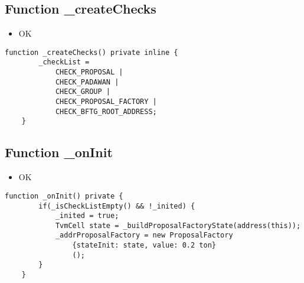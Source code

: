 \subsection{Function \_{}createChecks}

\begin{itemize}
\item OK
\end{itemize}

\begin{lstlisting}[firstnumber=42]
    function _createChecks() private inline {
        _checkList =
            CHECK_PROPOSAL |
            CHECK_PADAWAN |
            CHECK_GROUP |
            CHECK_PROPOSAL_FACTORY |
            CHECK_BFTG_ROOT_ADDRESS;
    }
\end{lstlisting}

\subsection{Function \_{}onInit}

\begin{itemize}
\item OK
\end{itemize}

\begin{lstlisting}[firstnumber=93]
    function _onInit() private {
        if(_isCheckListEmpty() && !_inited) {
            _inited = true;
            TvmCell state = _buildProposalFactoryState(address(this));
            _addrProposalFactory = new ProposalFactory
                {stateInit: state, value: 0.2 ton}
                ();
        }
    }
\end{lstlisting}
